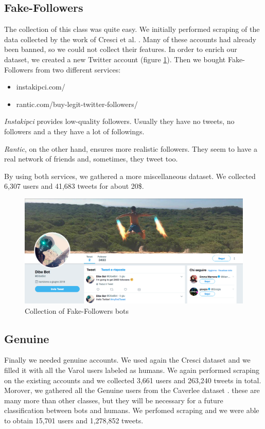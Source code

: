 \subsection{Fake-Followers}
The collection of this class was quite easy. We initially performed scraping of the data collected by the work of Cresci et al. \cite{Cresci}. Many of these accounts had already been banned, so we could not collect their features. In order to enrich our dataset, we created a new Twitter account (figure \ref{fig:dibebot}). Then we bought Fake-Followers from two different services:
\begin{itemize}
	\item[\PencilRight] instakipci.com/
	\item[\PencilRight] rantic.com/buy-legit-twitter-followers/
\end{itemize}

\emph{Instakipci} provides low-quality followers. Usually they have no tweets, no followers and a they have a lot of followings.

\emph{Rantic}, on the other hand, ensures more realistic followers. They seem to have a real network of friends and, sometimes, they tweet too.

By using both services, we gathered a more miscellaneous dataset.
We collected 6,307 users and 41,683 tweets for about 20\$.
\begin{figure}
	\centering
	\includegraphics[width=\columnwidth]{chapter3/figure/dibebot.png}
	\caption{Collection of Fake-Followers bots}
	\label{fig:dibebot}
\end{figure}

\subsection{Genuine}
Finally we needed genuine accounts. We used again the Cresci dataset \cite{Cresci} and we filled it with all the Varol users labeled as humans. We again performed scraping on the existing accounts and we collected 3,661 users and 263,240 tweets in total.
Morover, we gathered all the Genuine users from the Caverlee dataset \cite{Lee11sevenmonths}. these are many more than other classes, but they will be necessary for a future classification between bots and humans. We perfomed scraping and we were able to obtain 15,701 users and 1,278,852 tweets.

